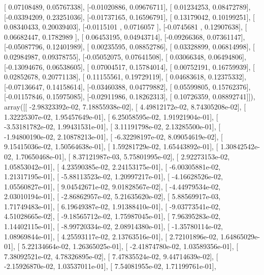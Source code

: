\documentclass{article}
\begin{document}
       [ 0.07108489,  0.05767338],
       [-0.01020886,  0.09676711],
       [ 0.01234253,  0.08472789],
       [-0.03394209,  0.23251036],
       [-0.01737165,  0.16596791],
       [ 0.13179042,  0.10199251],
       [ 0.08340433,  0.20039403],
       [-0.0115101 ,  0.0716057 ],
       [-0.0745681 ,  0.12907638],
       [ 0.06682447,  0.1782989 ],
       [ 0.06453195,  0.04943714],
       [-0.09266368,  0.07361147],
       [-0.05087796,  0.12401989],
       [ 0.00235595,  0.08852786],
       [ 0.03328899,  0.06814998],
       [ 0.02984987,  0.09378755],
       [-0.05052075,  0.07641508],
       [ 0.03066348,  0.06494806],
       [-0.13094676,  0.06538605],
       [ 0.07004517,  0.15784014],
       [ 0.00752191,  0.16759939],
       [ 0.02852678,  0.20771138],
       [ 0.11155561,  0.19729119],
       [ 0.04683618,  0.12375332],
       [-0.07136647,  0.14158614],
       [-0.03460388,  0.04779882],
       [ 0.05599805,  0.15762376],
       [-0.01157846,  0.15975085],
       [-0.02911986,  0.18262313],
       [ 0.10726359,  0.08892741]]), array([[ -2.98323392e-02,   7.18855938e-02],
       [  4.49812172e-02,   8.74305208e-02],
       [  1.32225307e-02,   1.95457649e-01],
       [  6.25058595e-02,   1.91921904e-01],
       [ -3.53181782e-02,   1.99431531e-01],
       [  3.11191798e-02,   2.13285500e-01],
       [ -1.94800190e-02,   2.10878213e-01],
       [ -6.32298197e-02,   8.09054619e-02],
       [  9.15415036e-02,   1.50564638e-01],
       [  1.59281729e-02,   1.65443892e-01],
       [  1.30842542e-02,   1.70650468e-01],
       [  8.37121987e-03,   5.75801995e-02],
       [  2.92273153e-02,   1.05853042e-01],
       [  4.23590385e-02,   2.24153175e-01],
       [ -6.00305881e-02,   1.21317195e-01],
       [ -5.88113523e-02,   1.20997217e-01],
       [ -4.16628526e-02,   1.05560827e-01],
       [  9.04542671e-02,   9.01828567e-02],
       [ -4.44979534e-02,   2.03010194e-01],
       [ -2.86862957e-02,   5.21635620e-02],
       [  5.88569917e-03,   1.71749483e-01],
       [  6.19649387e-02,   1.91388410e-01],
       [ -9.03773541e-02,   4.51028665e-02],
       [ -9.18565712e-02,   1.75987045e-01],
       [  7.96395283e-02,   1.14402115e-01],
       [ -8.99720334e-02,   2.08914380e-01],
       [ -1.35780114e-02,   1.08969844e-01],
       [  4.25593117e-02,   2.13763516e-01],
       [  2.72101896e-02,   1.64865029e-01],
       [  5.22134664e-02,   1.26365025e-01],
       [ -2.41874780e-02,   1.03589356e-01],
       [  7.38092521e-02,   4.78326895e-02],
       [  7.47835524e-02,   9.44714639e-02],
       [ -2.15926870e-02,   1.03537011e-01],
       [  7.54081955e-02,   1.71199761e-01],
\end{document}
